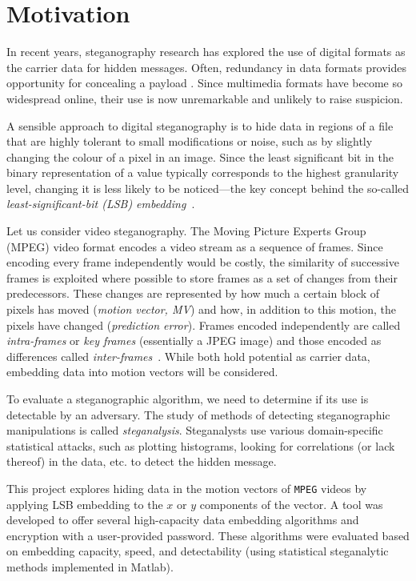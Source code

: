 \documentclass[12pt,british,twoside,notitlepage,usenames,dvipsnames,hypens,final]{report}
\numberwithin{equation}{section}
\numberwithin{figure}{section}
\begin{document}
\section{Motivation}
\label{motivation}

In recent years, steganography research has explored the use of digital formats as the carrier data for hidden messages. Often, redundancy in data formats provides opportunity for concealing a payload \cite[p.~2]{fridrich}. Since multimedia formats have become so widespread online, their use is now unremarkable and unlikely to raise suspicion.

A sensible approach to digital steganography is to hide data in regions of a file that are highly tolerant to small modifications or noise, such as by slightly changing the colour of a pixel in an image. Since the least significant bit in the binary representation of a value typically corresponds to the highest granularity level, changing it is less likely to be noticed---the key concept behind the so-called \emph{least-significant-bit (LSB) embedding}~\cite{bateman}\label{lsb-steg}. 

Let us consider video steganography. The Moving Picture Experts Group (MPEG) video format encodes a video stream as a sequence of frames. Since encoding every frame independently would be costly, the similarity of successive frames is exploited where possible to store frames as a set of changes from their predecessors. These changes are represented by how much a certain block of pixels has moved (\emph{motion vector, MV}) and how, in addition to this motion, the pixels have changed (\emph{prediction error}). Frames encoded independently are called \emph{intra-frames} or \emph{key frames} (essentially a JPEG image) and those encoded as differences called \emph{inter-frames}~\cite{h264-std}. While both hold potential as carrier data, embedding data into motion vectors will be considered.

To evaluate a steganographic algorithm, we need to determine if its use is detectable by an adversary. The study of methods of detecting steganographic manipulations is called \emph{steganalysis}. Steganalysts use various domain-specific statistical attacks, such as plotting histograms, looking for correlations (or lack thereof) in the data, etc. to detect the hidden message.

This project explores hiding data in the motion vectors of \texttt{MPEG} videos by applying LSB embedding to the $x$ or $y$ components of the vector. A tool was developed to offer several high-capacity data embedding algorithms and encryption with a user-provided password. These algorithms were evaluated based on embedding capacity, speed, and detectability (using statistical steganalytic methods implemented in Matlab).
\end{document}
